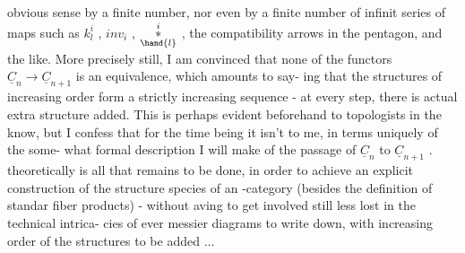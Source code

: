  

obvious sense by a finite number,  nor even by a finite number of infinit
series of maps such as $k^{i}_{l}$ , $inv_{i}$ , $\overset{i}{\underset{\hand{l}}{*}}$ , the compatibility arrows in
the pentagon,  and the like.  More precisely still,  I am convinced that
none of the functors $\underline{C}_{n} \to \underline{C}_{n+1}$ is an equivalence,  which amounts to say-%
ing that  the structures of increasing order form a strictly increasing
sequence  -  at every step,  there is actual extra structure added.  This
is perhaps evident beforehand to topologists in the know,  but I confess
that for the time being it isn't to me,  in terms uniquely of the some-%
what formal description I will make of the passage of $\underline{C}_{n}$ to $\underline{C}_{n+1}$ .
  theoretically is all that remains to be done,  in order to achieve 
an explicit construction of the  structure species of an
\unsure{\hand{$\infty$}}-category  (besides the definition of standar fiber products)  -
without aving to get involved still less lost  in the technical intrica-%
cies of ever messier diagrams to write down,  with increasing order of
the structures to be added ...


